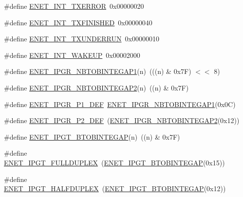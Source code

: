 \begin{DoxyCompactItemize}
\item 
\#define \hyperlink{group__ENET__17XX__40XX_ga6930081cf2294320579ddea844355ae5}{E\+N\+E\+T\+\_\+\+I\+N\+T\+\_\+\+T\+X\+E\+R\+R\+OR}~0x00000020
\item 
\#define \hyperlink{group__ENET__17XX__40XX_gae86d066808374ed933169271a2fd6932}{E\+N\+E\+T\+\_\+\+I\+N\+T\+\_\+\+T\+X\+F\+I\+N\+I\+S\+H\+ED}~0x00000040
\item 
\#define \hyperlink{group__ENET__17XX__40XX_gae41a8df58ad75321ba10799774141411}{E\+N\+E\+T\+\_\+\+I\+N\+T\+\_\+\+T\+X\+U\+N\+D\+E\+R\+R\+UN}~0x00000010
\item 
\#define \hyperlink{group__ENET__17XX__40XX_ga1741a903d6aad6718911587aa842ce8d}{E\+N\+E\+T\+\_\+\+I\+N\+T\+\_\+\+W\+A\+K\+E\+UP}~0x00002000
\item 
\#define \hyperlink{group__ENET__17XX__40XX_ga346ffe9920e1abd20950e001e920d1fb}{E\+N\+E\+T\+\_\+\+I\+P\+G\+R\+\_\+\+N\+B\+T\+O\+B\+I\+N\+T\+E\+G\+A\+P1}(n)~(((n) \& 0x7\+F) $<$$<$ 8)
\item 
\#define \hyperlink{group__ENET__17XX__40XX_gab665d33e25749c26b32f51b2a9e14b79}{E\+N\+E\+T\+\_\+\+I\+P\+G\+R\+\_\+\+N\+B\+T\+O\+B\+I\+N\+T\+E\+G\+A\+P2}(n)~((n) \& 0x7\+F)
\item 
\#define \hyperlink{group__ENET__17XX__40XX_gabb7222a12e8e058581bca37fd98cbbe5}{E\+N\+E\+T\+\_\+\+I\+P\+G\+R\+\_\+\+P1\+\_\+\+D\+EF}~\hyperlink{group__ENET__17XX__40XX_ga346ffe9920e1abd20950e001e920d1fb}{E\+N\+E\+T\+\_\+\+I\+P\+G\+R\+\_\+\+N\+B\+T\+O\+B\+I\+N\+T\+E\+G\+A\+P1}(0x0\+C)
\item 
\#define \hyperlink{group__ENET__17XX__40XX_gacb2c77e9648c3945d156149617c6d620}{E\+N\+E\+T\+\_\+\+I\+P\+G\+R\+\_\+\+P2\+\_\+\+D\+EF}~(\hyperlink{group__ENET__17XX__40XX_gab665d33e25749c26b32f51b2a9e14b79}{E\+N\+E\+T\+\_\+\+I\+P\+G\+R\+\_\+\+N\+B\+T\+O\+B\+I\+N\+T\+E\+G\+A\+P2}(0x12))
\item 
\#define \hyperlink{group__ENET__17XX__40XX_ga7cdae0530c55e9f236d7d9d5bde3391a}{E\+N\+E\+T\+\_\+\+I\+P\+G\+T\+\_\+\+B\+T\+O\+B\+I\+N\+T\+E\+G\+AP}(n)~((n) \& 0x7\+F)
\item 
\#define \hyperlink{group__ENET__17XX__40XX_gabcaea91a823fd58281d82d9dcb754c2f}{E\+N\+E\+T\+\_\+\+I\+P\+G\+T\+\_\+\+F\+U\+L\+L\+D\+U\+P\+L\+EX}~(\hyperlink{group__ENET__17XX__40XX_ga7cdae0530c55e9f236d7d9d5bde3391a}{E\+N\+E\+T\+\_\+\+I\+P\+G\+T\+\_\+\+B\+T\+O\+B\+I\+N\+T\+E\+G\+AP}(0x15))
\item 
\#define \hyperlink{group__ENET__17XX__40XX_ga4c98e396a39809243d38a68b27eeec02}{E\+N\+E\+T\+\_\+\+I\+P\+G\+T\+\_\+\+H\+A\+L\+F\+D\+U\+P\+L\+EX}~(\hyperlink{group__ENET__17XX__40XX_ga7cdae0530c55e9f236d7d9d5bde3391a}{E\+N\+E\+T\+\_\+\+I\+P\+G\+T\+\_\+\+B\+T\+O\+B\+I\+N\+T\+E\+G\+AP}(0x12))
$$
\end{DoxyCompactItemize}
